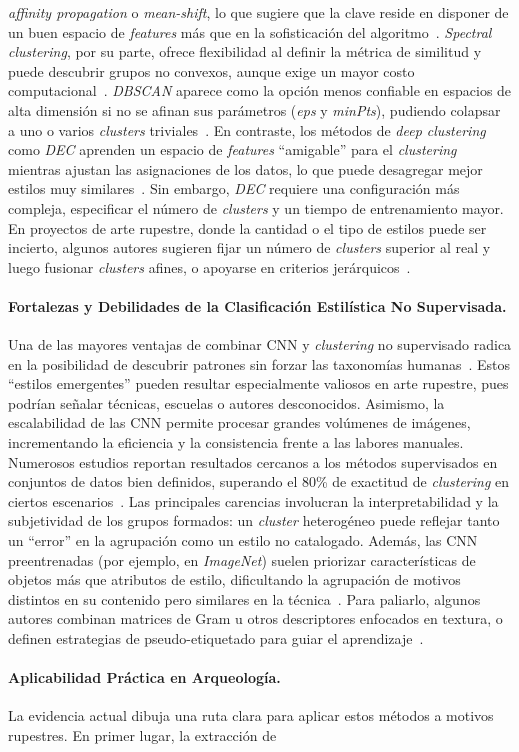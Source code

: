 \textit{affinity propagation} o \textit{mean-shift}, lo que sugiere que la clave reside en disponer de un buen espacio de \textit{features} más que en la sofisticación del algoritmo~\cite{dangeti2024}. \textit{Spectral clustering}, por su parte, ofrece flexibilidad al definir la métrica de similitud y puede descubrir grupos no convexos, aunque exige un mayor costo computacional~\cite{gultepe2018}. \textit{DBSCAN} aparece como la opción menos confiable en espacios de alta dimensión si no se afinan sus parámetros (\textit{eps} y \textit{minPts}), pudiendo colapsar a uno o varios \textit{clusters} triviales~\cite{dangeti2024}. En contraste, los métodos de \textit{deep clustering} como \textit{DEC} aprenden un espacio de \textit{features} “amigable” para el \textit{clustering} mientras ajustan las asignaciones de los datos, lo que puede desagregar mejor estilos muy similares~\cite{castellano2022}. Sin embargo, \textit{DEC} requiere una configuración más compleja, especificar el número de \textit{clusters} y un tiempo de entrenamiento mayor. En proyectos de arte rupestre, donde la cantidad o el tipo de estilos puede ser incierto, algunos autores sugieren fijar un número de \textit{clusters} superior al real y luego fusionar \textit{clusters} afines, o apoyarse en criterios jerárquicos~\cite{dangeti2024}. \paragraph{Fortalezas y Debilidades de la Clasificación Estilística No Supervisada.} Una de las mayores ventajas de combinar CNN y \textit{clustering} no supervisado radica en la posibilidad de descubrir patrones sin forzar las taxonomías humanas~\cite{castellano2022,wynen2018}. Estos “estilos emergentes” pueden resultar especialmente valiosos en arte rupestre, pues podrían señalar técnicas, escuelas o autores desconocidos. Asimismo, la escalabilidad de las CNN permite procesar grandes volúmenes de imágenes, incrementando la eficiencia y la consistencia frente a las labores manuales. Numerosos estudios reportan resultados cercanos a los métodos supervisados en conjuntos de datos bien definidos, superando el 80\% de exactitud de \textit{clustering} en ciertos escenarios~\cite{xue2023}. Las principales carencias involucran la interpretabilidad y la subjetividad de los grupos formados: un \textit{cluster} heterogéneo puede reflejar tanto un “error” en la agrupación como un estilo no catalogado. Además, las CNN preentrenadas (por ejemplo, en \textit{ImageNet}) suelen priorizar características de objetos más que atributos de estilo, dificultando la agrupación de motivos distintos en su contenido pero similares en la técnica~\cite{gairola2020}. Para paliarlo, algunos autores combinan matrices de Gram u otros descriptores enfocados en textura, o definen estrategias de pseudo-etiquetado para guiar el aprendizaje~\cite{gairola2020,dangeti2024}. \paragraph{Aplicabilidad Práctica en Arqueología.} La evidencia actual dibuja una ruta clara para aplicar estos métodos a motivos rupestres. En primer lugar, la extracción de 